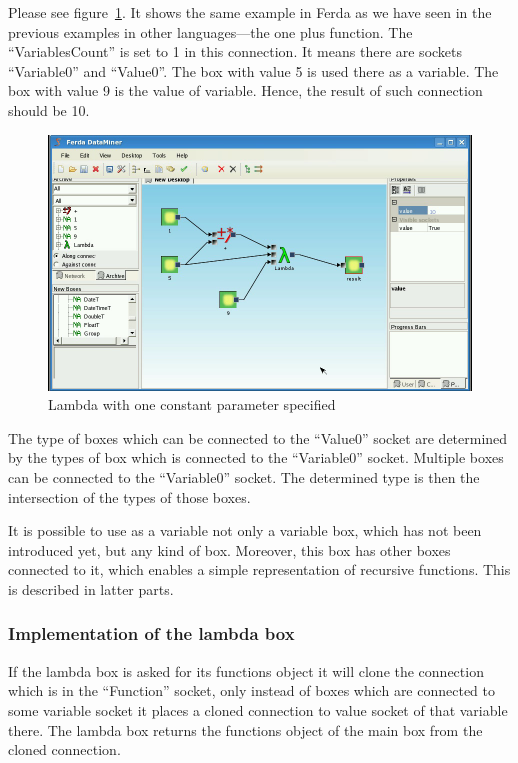 \documentclass[a4paper,12pt]{book}
\begin{document}
Please see figure~\ref{fig:boxLambdaOnePlus}. It shows the same example in Ferda as we have seen in the previous examples in other languages---the one plus function. The ``VariablesCount'' is set to 1 in this connection. It means there are sockets ``Variable0'' and ``Value0''. The box with value 5 is used there as a variable. The box with value 9 is the value of variable. Hence, the result of such connection should be 10.
\begin{figure}
	\includegraphics[width=1\textwidth]{lambdaBasic3.png}
	\caption{Lambda with one constant parameter specified}
	\label{fig:boxLambdaOnePlus}
\end{figure}

The type of boxes which can be connected to the ``Value0'' socket are determined by the types of box which is connected to the ``Variable0'' socket. Multiple boxes can be connected to the ``Variable0'' socket. The determined type is then the intersection of the types of those boxes.

It is possible to use as a variable not only a variable box, which has not been introduced yet, but any kind of box. Moreover, this box has other boxes connected to it, which enables a simple representation of recursive functions. This is described in latter parts.

\subsubsection{Implementation of the lambda box}
If the lambda box is asked for its functions object it will clone the connection which is in the ``Function'' socket, only instead of boxes which are connected to some variable socket it places a cloned connection to value socket of that variable there. The lambda box returns the functions object of the main box from the cloned connection.
\end{document}
